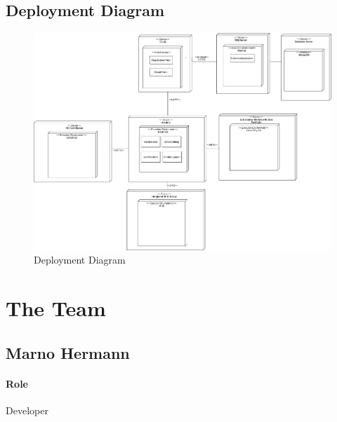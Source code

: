 \documentclass{article}
\begin{document}
         \subsection{Deployment Diagram}
\begin{figure}[h]
	\centering
		\includegraphics[width=\textwidth,height=\textheight,keepaspectratio]{img/CSIR.png}
		\caption{Deployment Diagram}	
	\end{figure}
	
\newpage
\section{The Team}
    \subsection{Marno Hermann}
        \paragraph{Role} Developer
    
\end{document}

